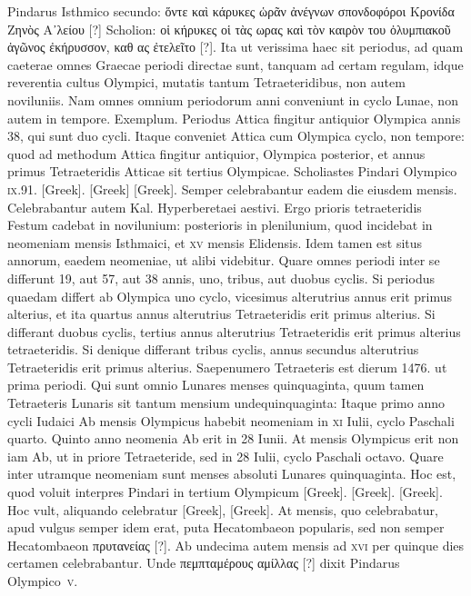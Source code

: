 Pindarus Isthmico secundo:
\textgreek{ὅντε καὶ κάρυκες ὡρᾶν ἀνέγνων σπονδοφόροι Κρονίδα Ζηνὸς Α᾽λείου [?]}
Scholion: \textgreek{οἱ κήρυκες οἱ τὰς ωρας καὶ τὸν καιρὸν του ὀλυμπιακοῦ ἀγῶνος
ἐκήρυσσον, καθ ας ἐτελεῖτο [?]}.
Ita ut verissima haec sit periodus, ad
quam caeterae omnes Graecae periodi directae sunt, tanquam ad certam
regulam, idque reverentia cultus Olympici, mutatis tantum Tetraeteridibus,
non autem noviluniis.
Nam omnes omnium periodorum anni
conveniunt in cyclo Lunae, non autem in tempore.
Exemplum.
Periodus
Attica fingitur antiquior Olympica annis 38, qui sunt duo cycli.
Itaque conveniet Attica cum Olympica cyclo, non tempore: quod
ad methodum Attica fingitur antiquior, Olympica posterior, et annus
primus Tetraeteridis Atticae sit tertius Olympicae.
Scholiastes Pindari
Olympico \textsc{ix}.91. \textgreek{[Greek]}.
\textgreek{[Greek]}
\textgreek{[Greek]}.
Semper celebrabantur eadem die
eiusdem mensis.
Celebrabantur autem Kal. Hyperberetaei aestivi.
Ergo
prioris tetraeteridis Festum cadebat in novilunium: posterioris in plenilunium,
quod incidebat in neomeniam mensis Isthmaici, et \textsc{xv} mensis
Elidensis.
Idem tamen est situs annorum, eaedem neomeniae, ut alibi
videbitur.
Quare omnes periodi inter se differunt 19, aut 57, aut 38
annis, uno, tribus, aut duobus cyclis.
Si periodus quaedam differt ab
Olympica uno cyclo, vicesimus alterutrius annus erit primus alterius,
et ita quartus annus alterutrius Tetraeteridis erit primus alterius.
Si differant
duobus cyclis, tertius annus alterutrius Tetraeteridis erit primus
alterius tetraeteridis.
Si denique differant tribus cyclis, annus secundus
alterutrius Tetraeteridis erit primus alterius.
Saepenumero Tetraeteris
est dierum 1476. ut prima periodi.
Qui sunt omnio Lunares
menses quinquaginta, quum tamen Tetraeteris Lunaris sit tantum
mensium undequinquaginta: Itaque primo anno cycli Iudaici Ab mensis
Olympicus habebit neomeniam in \textsc{xi} Iulii, cyclo Paschali quarto.
Quinto
anno neomenia Ab erit in 28 Iunii.
At mensis Olympicus erit non iam
Ab, ut in priore Tetraeteride, sed in 28 Iulii, cyclo Paschali octavo.
Quare inter utramque neomeniam sunt menses absoluti
 Lunares quinquaginta.
Hoc est, quod voluit interpres Pindari in tertium Olympicum
\textgreek{[Greek]}.
\textgreek{[Greek]}.
\textgreek{[Greek]}.
Hoc
vult, aliquando celebratur \textgreek{[Greek]}, \textgreek{[Greek]}.
At mensis, quo celebrabatur, apud vulgus semper
idem erat, puta Hecatombaeon popularis, sed non semper Hecatombaeon
\textgreek{πρυτανείας [?]}.
Ab undecima autem mensis ad \textsc{xvi} per quinque
dies certamen celebrabantur.
Unde \textgreek{πεμπταμέρους αμίλλας [?]} dixit Pindarus
Olympico~\textsc{v}.


